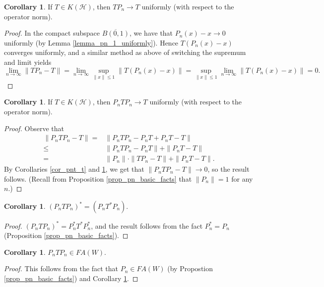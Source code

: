 \documentclass{dcthesis}
\numberwithin{equation}{section}
\numberwithin{equation}{section}
\theoremstyle{definition}
\newtheorem{corollary}[equation]{Corollary}
\begin{document}
\begin{corollary}
\label{cor_tpn_t}
	If $T\in K(\mathcal{H})$, then $TP_n\to T$ uniformly (with respect to the operator norm).
\end{corollary}
\begin{proof}
	In the compact subspace $\overline{B(0,1)}$, we have that $P_n(x)-x\to 0$ uniformly (by Lemma \ref{lemma_pn_1_uniformly}). Hence $T(P_n(x)-x)$ converges uniformly, and a similar method as above of switching the supremum and limit yields 
	\begin{equation*}
		\lim_{n\to\infty}\|TP_n-T\|=\lim_{n\to\infty}\sup_{\|x\|\leq 1}\|T(P_n(x)-x)\|=\sup_{\|x\|\leq 1}\lim_{n\to\infty}\|T(P_n(x)-x)\|=0.
	\end{equation*}
\end{proof}

\begin{corollary}
\label{cor_pntpn_t}
	If $T\in K(\mathcal{H})$, then $P_nTP_n\to T$ uniformly (with respect to the operator norm).
\end{corollary}
\begin{proof}
	Observe that
	\begin{align*}
		\|P_nTP_n - T\| =& \|P_nTP_n - P_nT + P_nT - T\| \\
		\leq & \|P_nTP_n - P_nT\| + \|P_nT - T\| \\
		=& \|P_n\|\cdot\|TP_n-T\| + \|P_nT-T\|. 
	\end{align*}
	By Corollaries \ref{cor_pnt_t} and \ref{cor_tpn_t}, we get that $\|P_nTP_n-T\|\to 0$, so the result follows. (Recall from Proposition \ref{prop_pn_basic_facts} that $\|P_n\|=1$ for any $n$.)
\end{proof}

\begin{corollary}
\label{cor_pntpn_adjoint}
	$(P_nTP_n)^\ast = (P_n T^\ast P_n)$.
\end{corollary}
\begin{proof}
	$(P_nTP_n)^\ast = P_n^\ast T^\ast P_n^\ast$, and the result follows from the fact $P_n^\ast=P_n$ (Proposition \ref{prop_pn_basic_facts}).
\end{proof}

\begin{corollary}
\label{cor_pntpn_in_jaw}
	$P_nTP_n\in FA(W)$.
\end{corollary}
\begin{proof}
	This follows from the fact that $P_n\in FA(W)$ (by Propostion \ref{prop_pn_basic_facts}) and Corollary \ref{cor_pntpn_adjoint}.
\end{proof}
\end{document}
